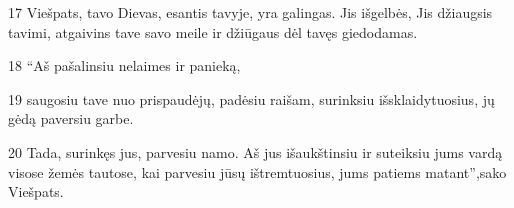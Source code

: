 \par 17 Viešpats, tavo Dievas, esantis tavyje, yra galingas. Jis išgelbės, Jis džiaugsis tavimi, atgaivins tave savo meile ir džiūgaus dėl tavęs giedodamas. 
\par 18 “Aš pašalinsiu nelaimes ir panieką, 
\par 19 saugosiu tave nuo prispaudėjų, padėsiu raišam, surinksiu išsklaidytuosius, jų gėdą paversiu garbe. 
\par 20 Tada, surinkęs jus, parvesiu namo. Aš jus išaukštinsiu ir suteiksiu jums vardą visose žemės tautose, kai parvesiu jūsų ištremtuosius, jums patiems matant”,­sako Viešpats.




